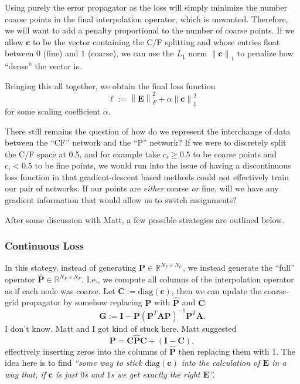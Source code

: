 \documentclass{article}
\newcommand{\norm}[1]{\left\lVert#1\right\rVert}
\newcommand{\mat}[1]{\bm{{#1}}}
\renewcommand{\vec}[1]{\bm{{#1}}}
\begin{document}
Using purely the error propagator as the loss will simply minimize the number coarse points in the final interpolation operator, which is unwanted.  Therefore, we will want to add a penalty proportional to the number of coarse points.  If we allow $\vec{c}$ to be the vector containing the C/F splitting and whose entries float between $0$ (fine) and $1$ (coarse), we can use the $L_1$ norm $\norm{\vec{c}}_1$ to penalize how ``dense'' the vector is.

Bringing this all together, we obtain the final loss function
\begin{equation}
  \ell := \norm{\mat{E}}^2_F + \alpha \norm{\vec{c}}_1^2 \label{eqn:loss}
\end{equation}
for some scaling coefficient $\alpha$.

There still remains the question of how do we represent the interchange of data between the ``CF'' network and the ``P'' network?  If we were to discretely split the C/F space at 0.5, and for example take $c_i\geq 0.5$ to be coarse points and $c_i<0.5$ to be fine points, we would run into the issue of having a discontinuous loss function in that gradient-descent based methods could not effectively train our pair of networks.   If our points are \textit{either} coarse \textit{or} fine, will we have any gradient information that would allow us to switch assignments?

After some discussion with Matt, a few possible strategies are outlined below.
\subsubsection{Continuous Loss}
In this stategy, instead of generating $\mat{P} \in \mathbb{R}^{N_F\times N_C}$, we instead generate the ``full'' operator $\hat{\mat{P}} \in \mathbb{R}^{N_F \times N_F}$.  I.e., we compute all columns of the interpolation operator as if each node was coarse.  Let $\mat{C} := \text{diag}\left(\vec{c}\right)$, then we can update the coarse-grid propagator by somehow replacing $\mat{P}$ with $\hat{\mat{P}}$ and $\mat{C}$:
\begin{equation}
  \mat{G} := \mat{I} - \mat{P} \left( \mat{P}^T \mat{A} \mat{P} \right)^{-1} \mat{P}^T \mat{A}.
\end{equation}
I don't know.  Matt and I got kind of stuck here.  Matt suggested
\begin{equation}
  \mat{P} = \mat{C} \hat{\mat{P}} \mat{C} + \left(\mat{I} - \mat{C}\right),
\end{equation}
effectively inserting zeros into the columns of $\hat{\mat{P}}$ then replacing them with $1$.  The idea here is to find \textit{``some way to stick $\text{diag}\left(\vec{c}\right)$ into the calculation of $\mat{E}$ in a way that, if $\vec{c}$ is just $0$s and $1$s we get exactly the right $\mat{E}$''.}
\end{document}
